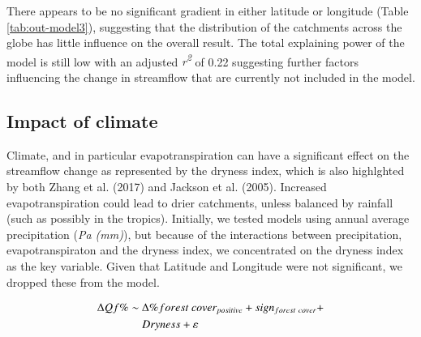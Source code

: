 \documentclass[]{elsarticle} %
\begin{document}
There appears to be no significant gradient in either latitude or longitude (Table \ref{tab:out-model3}), suggesting that the distribution of the catchments across the globe has little influence on the overall result. The total explaining power of the model is still low with an adjusted \emph{r\textsuperscript{2}} of 0.22 suggesting further factors influencing the change in streamflow that are currently not included in the model.

\hypertarget{impact-of-climate}{%
\subsection{Impact of climate}\label{impact-of-climate}}

Climate, and in particular evapotranspiration can have a significant effect on the streamflow change as represented by the dryness index, which is also highlghted by both Zhang et al. (2017) and Jackson et al. (2005). Increased evapotranspiration could lead to drier catchments, unless balanced by rainfall (such as possibly in the tropics). Initially, we tested models using annual average precipitation (\emph{Pa (mm)}), but because of the interactions between precipitation, evapotranspiraton and the dryness index, we concentrated on the dryness index as the key variable. Given that Latitude and Longitude were not significant, we dropped these from the model.

\begin{align}
\Delta Qf \% \sim ~ & \Delta \% forest~cover_{positive} + sign_{forest~cover} + \notag \\ & Dryness + \varepsilon \label{eq:eq5}
\end{align}
\end{document}
